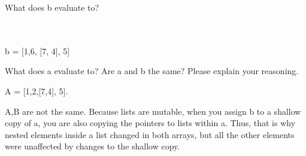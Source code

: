 What does b evaluate to? \\
\\ 
\\ 
\begin{solution}
b = [1,6, [7, 4], 5]
\end{solution}
What does a evaluate to? Are a and b the same? Please explain your reasoning. 
\begin{solution}
A = [1,2,[7,4], 5].

A,B are not the same. Because lists are mutable, when you assign b to a shallow copy of a, you are also copying the pointers to lists within a. Thus, that is why nested elements inside a list changed in both arrays, but all the other elements were unaffected by changes to the shallow copy. 
\end{solution}

